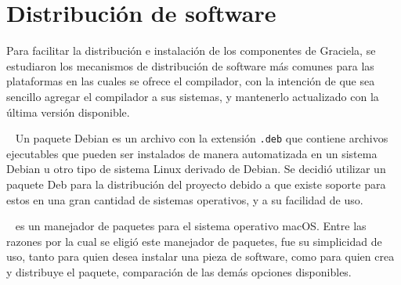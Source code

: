 \section{Distribución de software}

Para facilitar la distribución e instalación de los componentes de Graciela, se
estudiaron los mecanismos de distribución de software más comunes para las
plataformas en las cuales se ofrece el compilador, con la intención de que sea
sencillo agregar el compilador a sus sistemas, y mantenerlo actualizado con la
última versión disponible.

\begin{description}[leftmargin=!,labelwidth=\widthof{\bfseries Homebrew}]

\item [Deb]~\cite{deb} Un paquete Debian es un archivo con la extensión 
\texttt{.deb} que contiene archivos ejecutables que pueden ser instalados de
manera automatizada en un sistema Debian u otro tipo de sistema Linux derivado
de Debian. Se decidió utilizar un paquete Deb para la distribución del proyecto
debido a que existe soporte para estos en una gran cantidad de sistemas 
operativos, y a su facilidad de uso.

\item [Homebrew]~\cite{brew} es un manejador de paquetes para el sistema
operativo macOS. Entre las razones por la cual se eligió este manejador de
paquetes, fue su simplicidad de uso, tanto para quien desea instalar una pieza
de software, como para quien crea y distribuye el paquete, comparación de las
demás opciones disponibles.

\end{description}

